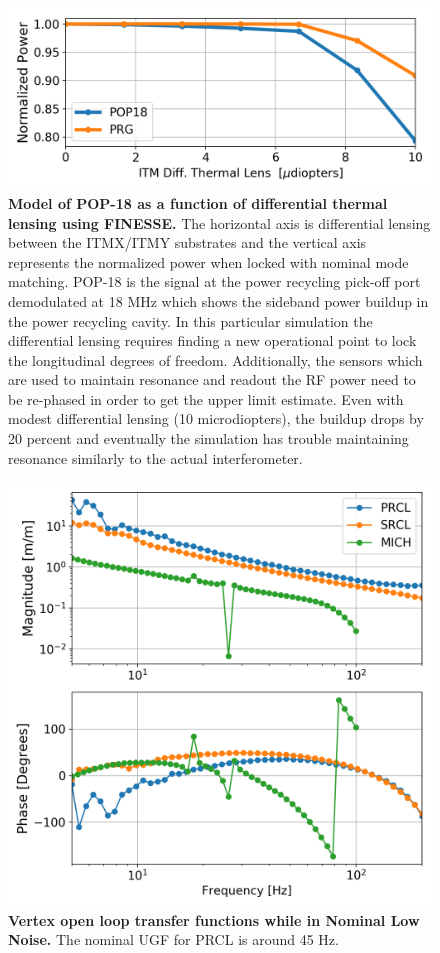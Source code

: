 \begin{figure}[ht]
	\centering
	\includegraphics[width=0.75 \textwidth]{../Figures/POP_18dive.png}
	\caption[Model of POP-18 as a function of differential thermal lensing using FINESSE.]  
	{\textbf{Model of POP-18 as a function of differential thermal lensing using FINESSE.}
		The horizontal axis is differential lensing between the ITMX/ITMY substrates and the vertical axis represents the normalized power when locked with nominal mode matching.  POP-18 is the signal at the power recycling pick-off port demodulated at 18 MHz which shows the sideband power buildup in the power recycling cavity. In this particular simulation the differential lensing requires finding a new operational point to lock the longitudinal degrees of freedom.  Additionally, the sensors which are used to maintain resonance and readout the RF power need to be re-phased in order to get the upper limit estimate.  Even with modest differential lensing (10 microdiopters), the buildup drops by 20 percent and eventually the simulation has trouble maintaining resonance similarly to the actual interferometer.
	}
	\label{fig:POP18}
\end{figure}

\begin{figure}[ht]
	\centering
	\includegraphics[width=0.75 \textwidth]{../Figures/MeasuredVertexOLF.png}
	\caption[Vertex open loop transfer functions while in Nominal Low Noise.]  
	{\textbf{Vertex open loop transfer functions while in Nominal Low Noise.}
	The nominal UGF for PRCL is around 45 Hz.
	}
	\label{fig:vertex_OLTF}
\end{figure}

